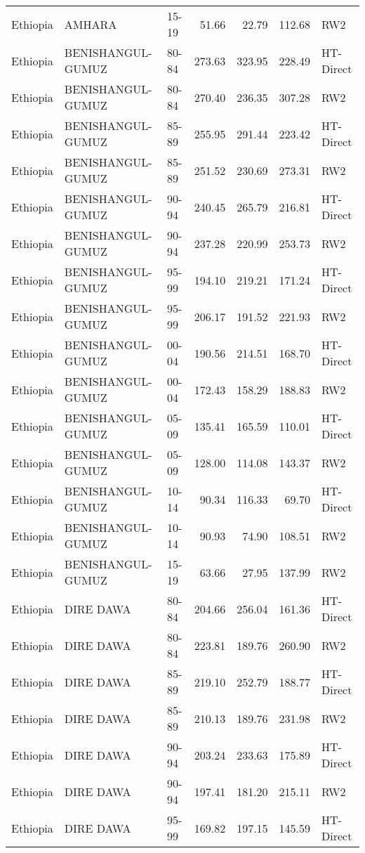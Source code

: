 \begin{longtable}{lllrrrl}
  Ethiopia & AMHARA & 15-19 & 51.66 & 22.79 & 112.68 & RW2 \\ 
  Ethiopia & BENISHANGUL-GUMUZ & 80-84 & 273.63 & 323.95 & 228.49 & HT-Direct \\ 
  Ethiopia & BENISHANGUL-GUMUZ & 80-84 & 270.40 & 236.35 & 307.28 & RW2 \\ 
  Ethiopia & BENISHANGUL-GUMUZ & 85-89 & 255.95 & 291.44 & 223.42 & HT-Direct \\ 
  Ethiopia & BENISHANGUL-GUMUZ & 85-89 & 251.52 & 230.69 & 273.31 & RW2 \\ 
  Ethiopia & BENISHANGUL-GUMUZ & 90-94 & 240.45 & 265.79 & 216.81 & HT-Direct \\ 
  Ethiopia & BENISHANGUL-GUMUZ & 90-94 & 237.28 & 220.99 & 253.73 & RW2 \\ 
  Ethiopia & BENISHANGUL-GUMUZ & 95-99 & 194.10 & 219.21 & 171.24 & HT-Direct \\ 
  Ethiopia & BENISHANGUL-GUMUZ & 95-99 & 206.17 & 191.52 & 221.93 & RW2 \\ 
  Ethiopia & BENISHANGUL-GUMUZ & 00-04 & 190.56 & 214.51 & 168.70 & HT-Direct \\ 
  Ethiopia & BENISHANGUL-GUMUZ & 00-04 & 172.43 & 158.29 & 188.83 & RW2 \\ 
  Ethiopia & BENISHANGUL-GUMUZ & 05-09 & 135.41 & 165.59 & 110.01 & HT-Direct \\ 
  Ethiopia & BENISHANGUL-GUMUZ & 05-09 & 128.00 & 114.08 & 143.37 & RW2 \\ 
  Ethiopia & BENISHANGUL-GUMUZ & 10-14 & 90.34 & 116.33 & 69.70 & HT-Direct \\ 
  Ethiopia & BENISHANGUL-GUMUZ & 10-14 & 90.93 & 74.90 & 108.51 & RW2 \\ 
  Ethiopia & BENISHANGUL-GUMUZ & 15-19 & 63.66 & 27.95 & 137.99 & RW2 \\ 
  Ethiopia & DIRE DAWA & 80-84 & 204.66 & 256.04 & 161.36 & HT-Direct \\ 
  Ethiopia & DIRE DAWA & 80-84 & 223.81 & 189.76 & 260.90 & RW2 \\ 
  Ethiopia & DIRE DAWA & 85-89 & 219.10 & 252.79 & 188.77 & HT-Direct \\ 
  Ethiopia & DIRE DAWA & 85-89 & 210.13 & 189.76 & 231.98 & RW2 \\ 
  Ethiopia & DIRE DAWA & 90-94 & 203.24 & 233.63 & 175.89 & HT-Direct \\ 
  Ethiopia & DIRE DAWA & 90-94 & 197.41 & 181.20 & 215.11 & RW2 \\ 
  Ethiopia & DIRE DAWA & 95-99 & 169.82 & 197.15 & 145.59 & HT-Direct \\ 

\end{longtable}
